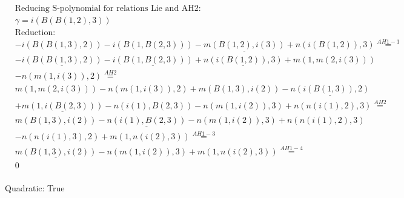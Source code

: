 \documentclass[11pt]{amsart}
\begin{document}
\begin{align*} 
& \text{Reducing S-polynomial for relations Lie and AH2:} \\ 
& \gamma = i(B(B(1,2),3)) \\ 
& \text{Reduction}: \\& - i(B(B(1,3),2)) - i(B(1,B(2,3))) - \underline{m(B(1,2),i(3))} + n(i(B(1,2)),3) \stackrel{ AH1-1 }{=}  \\ 
& - \underline{i(B(B(1,3),2))} - \underline{i(B(1,B(2,3)))} + \underline{n(i(B(1,2)),3)} + m(1,m(2,i(3)))\\ 
 &  - n(m(1,i(3)),2) \stackrel{ AH2 }{=}  \\ 
&m(1,m(2,i(3))) - n(m(1,i(3)),2) + m(B(1,3),i(2)) - \underline{n(i(B(1,3)),2)}\\ 
 &  + \underline{m(1,i(B(2,3)))} - n(i(1),B(2,3)) - n(m(1,i(2)),3) + n(n(i(1),2),3) \stackrel{ AH2 }{=}  \\ 
&m(B(1,3),i(2)) - \underline{n(i(1),B(2,3))} - n(m(1,i(2)),3) + n(n(i(1),2),3)\\ 
 &  - n(n(i(1),3),2) + m(1,n(i(2),3)) \stackrel{ AH1-3 }{=}  \\ 
&\underline{m(B(1,3),i(2))} - n(m(1,i(2)),3) + m(1,n(i(2),3)) \stackrel{ AH1-4 }{=}  \\ 
&0\\ 
\end{align*} 
 

 Quadratic: True
 
\end{document}
